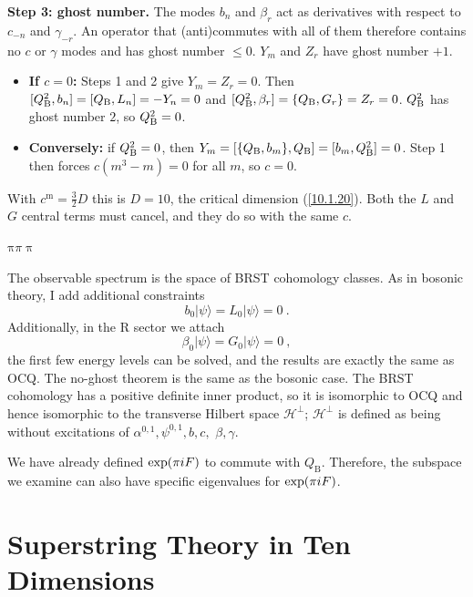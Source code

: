 \begin{tcolorbox}[breakable]
\begin{remark}
			\textbf{Step 3: ghost number.} The modes $b_n$ and $\beta_r$ act as derivatives with respect to $c_{-n}$ and $\gamma_{-r}$. An operator that (anti)commutes with all of them therefore contains no $c$ or $\gamma$ modes and has ghost number $\le0$. $Y_m$ and $Z_r$ have ghost number $+1$.
			\begin{itemize}
				\item \textbf{If $c=0$:} Steps 1 and 2 give $Y_m=Z_r=0$. Then $[Q_{\rm B}^{2},b_n]=[Q_{\rm B},L_n]=-Y_n=0$ and $[Q_{\rm B}^{2},\beta_r]=\{Q_{\rm B},G_r\}=Z_r=0$. $Q_{\rm B}^{2}$ has ghost number $2$, so $Q_{\rm B}^{2}=0$.
				\item \textbf{Conversely:} if $Q_{\rm B}^{2}=0$, then $Y_m=[\{Q_{\rm B},b_m\},Q_{\rm B}]=[b_m,Q_{\rm B}^{2}]=0$. Step 1 then forces $c(m^{3}-m)=0$ for all $m$, so $c=0$.
			\end{itemize}
			With $c^{\mathrm m}=\tfrac32D$ this is $\boxed{D=10}$, the critical dimension (\ref{10.1.20}). Both the $L$ and $G$ central terms must cancel, and they do so with the same $c$.
		\end{remark}
	\end{tcolorbox}
	$\mathrm{\pi} \pi \uppi$
	
	The observable spectrum is the space of BRST cohomology classes. As in bosonic theory, I add additional constraints
	\begin{equation}
		b_{0}\lvert \psi\rangle = L_{0}\lvert\psi\rangle = 0 \:. \label{10.5.25} 
	\end{equation}
	Additionally, in the R sector we attach
	\begin{equation}
		\beta_{0}\lvert \psi \rangle = G_{0}\lvert \psi \rangle = 0\:, \label{10.5.26}
	\end{equation}
	the first few energy levels can be solved, and the results are exactly the same as OCQ. The no-ghost theorem is the same as the bosonic case. The BRST cohomology has a positive definite inner product, so it is isomorphic to OCQ and hence isomorphic to the transverse Hilbert space $\mathscr{H}^{\bot}$; $\mathscr{H}^{\bot}$ is defined as being without excitations of $\alpha^{0,1},\psi^{0,1},b,c,$ $\beta,\gamma$. 
	
	We have already defined $\exp(\pi i F)$ to commute with $Q_{\text{B}}$. Therefore, the subspace we examine can also have specific eigenvalues for $\exp(\pi i F)$.
	
	\section{Superstring Theory in Ten Dimensions}
	
